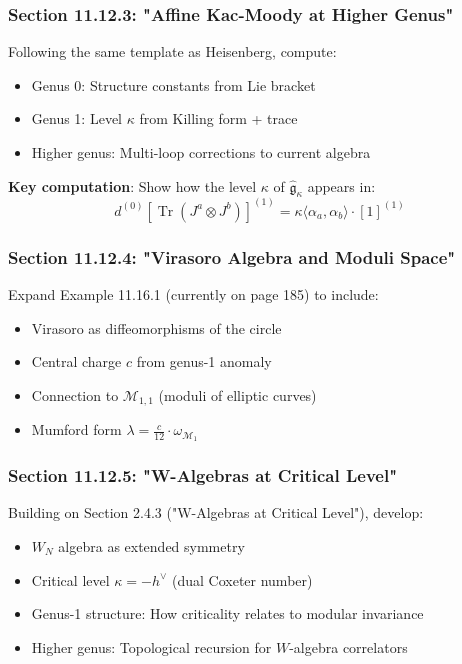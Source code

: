 \subsubsection{Section 11.12.3: "Affine Kac-Moody at Higher Genus"}

Following the same template as Heisenberg, compute:
\begin{itemize}
\item Genus 0: Structure constants from Lie bracket
\item Genus 1: Level $\kappa$ from Killing form + trace
\item Higher genus: Multi-loop corrections to current algebra
\end{itemize}

\textbf{Key computation}: Show how the level $\kappa$ of $\hat{\mathfrak{g}}_\kappa$ appears in:
\begin{equation}
d^{(0)}[\operatorname{Tr}(J^a \otimes J^b)]^{(1)} = \kappa \langle \alpha_a, \alpha_b \rangle \cdot [1]^{(1)}
\end{equation}

\subsubsection{Section 11.12.4: "Virasoro Algebra and Moduli Space"}

Expand Example 11.16.1 (currently on page 185) to include:
\begin{itemize}
\item Virasoro as diffeomorphisms of the circle
\item Central charge $c$ from genus-1 anomaly
\item Connection to $\mathcal{M}_{1,1}$ (moduli of elliptic curves)
\item Mumford form $\lambda = \frac{c}{12} \cdot \omega_{\mathcal{M}_1}$
\end{itemize}

\subsubsection{Section 11.12.5: "W-Algebras at Critical Level"}

Building on Section 2.4.3 ("W-Algebras at Critical Level"), develop:
\begin{itemize}
\item $W_N$ algebra as extended symmetry
\item Critical level $\kappa = -h^\vee$ (dual Coxeter number)
\item Genus-1 structure: How criticality relates to modular invariance
\item Higher genus: Topological recursion for $W$-algebra correlators
\end{itemize}

